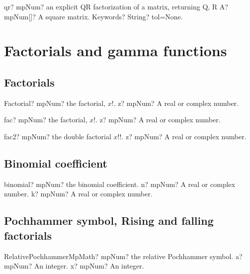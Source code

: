\documentclass[12pt,a4paper,openany]{book}
\begin{document}
\begin{mpFunctionsExtract}
\mpFunctionTwo
{qr? mpNum? an explicit QR factorization of a matrix, returning Q, R}
{A? mpNum[]? A square matrix.}
{Keywords? String?  tol=None.}
\end{mpFunctionsExtract}

\chapter{Factorials and gamma functions}

\section{Factorials}

\begin{mpFunctionsExtract}
\mpFunctionOne
{Factorial? mpNum? the factorial, $x!$.}
{z? mpNum? A real or complex number.}
\end{mpFunctionsExtract}

\begin{mpFunctionsExtract}
\mpFunctionOne
{fac? mpNum? the factorial, $x!$.}
{z? mpNum? A real or complex number.}
\end{mpFunctionsExtract}

\begin{mpFunctionsExtract}
\mpFunctionOne
{fac2? mpNum? the double factorial $x!!$.}
{z? mpNum? A real or complex number.}
\end{mpFunctionsExtract}

\section{Binomial coefficient}

\begin{mpFunctionsExtract}
\mpFunctionTwo
{binomial? mpNum? the binomial coefficient.}
{n? mpNum? A real or complex number.}
{k? mpNum? A real or complex number.}
\end{mpFunctionsExtract}

\section{Pochhammer symbol, Rising and falling factorials}

\begin{mpFunctionsExtract}
\mpFunctionTwoNotImplemented
{RelativePochhammerMpMath? mpNum? the relative Pochhammer symbol.}
{a? mpNum? An integer.}
{x? mpNum? An integer.}
\end{mpFunctionsExtract}
\end{document}
